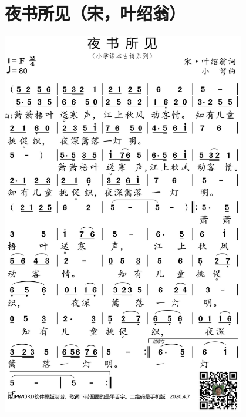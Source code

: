 \documentclass[cn,pad,twocol]{elegantbook}
\begin{document}
\section{夜书所见（宋，叶绍翁）}\includegraphics[width=0.8\textwidth]{dongxiao/20200627-古诗-夜书所见.jpg}   
\end{document}
